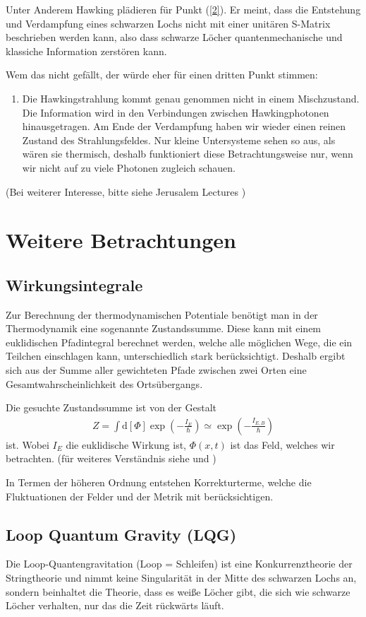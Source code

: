 \documentclass[ngerman]{scrartcl}
\newcommand{\diff}{\mathrm{d}}
\begin{document}
Unter Anderem Hawking plädieren für Punkt (\ref{2}). Er meint, dass die Entstehung und Verdampfung eines schwarzen Lochs nicht mit einer unitären S-Matrix beschrieben werden kann, also dass schwarze Löcher quantenmechanische und klassiche Information zerstören kann. 

Wem das nicht gefällt, der würde eher für einen dritten Punkt stimmen:
	\begin{enumerate}[(3)]
		\item Die Hawkingstrahlung kommt genau genommen nicht in einem Mischzustand. Die Information wird in den Verbindungen zwischen Hawkingphotonen hinausgetragen. Am Ende der Verdampfung haben wir wieder einen reinen Zustand des Strahlungsfeldes. Nur kleine Untersysteme sehen so aus, als wären sie thermisch, deshalb funktioniert diese Betrachtungsweise nur, wenn wir nicht auf zu viele Photonen zugleich schauen. 
	\end{enumerate}   
(Bei weiterer Interesse, bitte siehe Jerusalem Lectures \cite{JerusalemsLectures})
	
\section{Weitere Betrachtungen}
	\subsection{Wirkungsintegrale}
	Zur Berechnung der thermodynamischen Potentiale benötigt man in der Thermodynamik eine sogenannte Zustandssumme. Diese kann mit einem euklidischen Pfadintegral berechnet werden, welche alle möglichen Wege, die ein Teilchen einschlagen kann, unterschiedlich stark berücksichtigt. Deshalb ergibt sich aus der Summe aller gewichteten Pfade zwischen zwei Orten eine Gesamtwahrscheinlichkeit des Ortsübergangs.
	
	Die gesuchte Zustandssumme ist von der Gestalt 
		\begin{align}
			Z = \int \diff [\Phi] \exp \left(- \frac{I_E}{\hbar}\right) 
			\simeq \exp \left(- \frac{I_{E,B}}{\hbar}\right)
		\end{align}
	ist. Wobei $I_E$ die euklidische Wirkung ist, $\Phi(x,t)$ ist das Feld, welches wir betrachten. (für weiteres Verständnis siehe \cite{Gebhardt} und \cite{Pfadintegral})
	
	In Termen der höheren Ordnung entstehen Korrekturterme, welche die Fluktuationen der Felder und der  Metrik mit berücksichtigen.
	
	\subsection{Loop Quantum Gravity (LQG)}	%
Die Loop-Quantengravitation (Loop = Schleifen) ist eine Konkurrenztheorie der Stringtheorie und nimmt keine Singularität in der Mitte des schwarzen Lochs an, sondern beinhaltet die Theorie, dass es weiße Löcher gibt, die sich wie schwarze Löcher verhalten, nur das die Zeit rückwärts läuft. 
\end{document}
